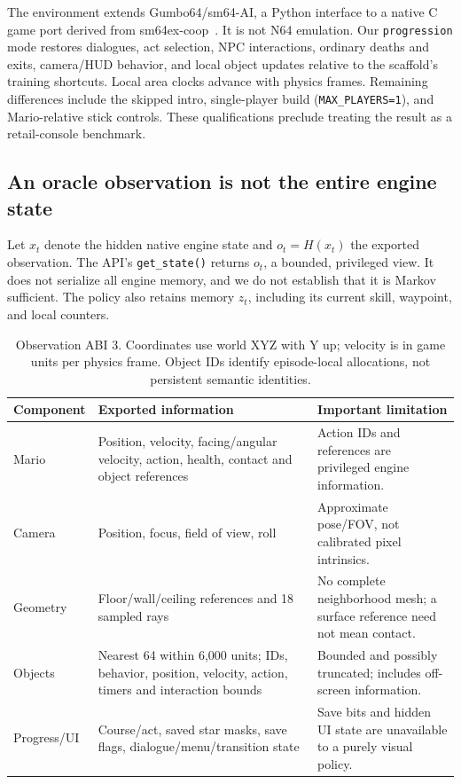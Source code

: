\documentclass[10pt,letterpaper]{article}
\newcommand{\code}[1]{\texttt{#1}}
\begin{document}
The environment extends Gumbo64/sm64-AI, a Python interface to a native C game port derived from sm64ex-coop~\cite{gumbo}. It is not N64 emulation. Our \code{progression} mode restores dialogues, act selection, NPC interactions, ordinary deaths and exits, camera/HUD behavior, and local object updates relative to the scaffold's training shortcuts. Local area clocks advance with physics frames. Remaining differences include the skipped intro, single-player build (\code{MAX\_PLAYERS=1}), and Mario-relative stick controls. These qualifications preclude treating the result as a retail-console benchmark.

\subsection{An oracle observation is not the entire engine state}
Let $x_t$ denote the hidden native engine state and $o_t=H(x_t)$ the exported observation. The API's \code{get\_state()} returns $o_t$, a bounded, privileged view. It does not serialize all engine memory, and we do not establish that it is Markov sufficient. The policy also retains memory $z_t$, including its current skill, waypoint, and local counters.

\begin{table}[h]\centering\small
\begin{tabularx}{\linewidth}{@{}p{2.3cm}YY@{}}
\toprule
Component & Exported information & Important limitation \\
\midrule
Mario & Position, velocity, facing/angular velocity, action, health, contact and object references & Action IDs and references are privileged engine information. \\
Camera & Position, focus, field of view, roll & Approximate pose/FOV, not calibrated pixel intrinsics. \\
Geometry & Floor/wall/ceiling references and 18 sampled rays & No complete neighborhood mesh; a surface reference need not mean contact. \\
Objects & Nearest 64 within 6,000 units; IDs, behavior, position, velocity, action, timers and interaction bounds & Bounded and possibly truncated; includes off-screen information. \\
Progress/UI & Course/act, saved star masks, save flags, dialogue/menu/transition state & Save bits and hidden UI state are unavailable to a purely visual policy. \\
\bottomrule
\end{tabularx}
\caption{Observation ABI 3. Coordinates use world XYZ with Y up; velocity is in game units per physics frame. Object IDs identify episode-local allocations, not persistent semantic identities.}
\end{table}
\end{document}
